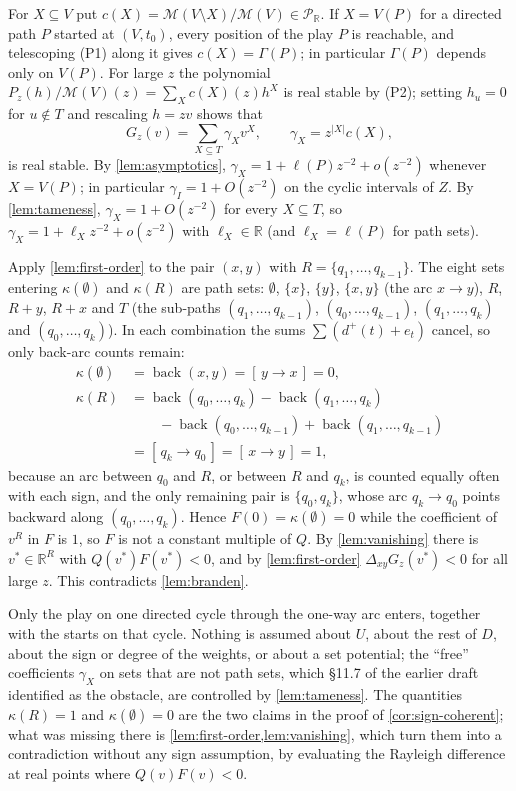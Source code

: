 \documentclass[final]{siamart0516}
\numberwithin{theorem}{section}
\numberwithin{equation}{section}
\theoremstyle{siamnonum}
\theoremstyle{plain}
\providecommand{\qed}{\hfill\proofbox}
\newcommand{\RR}{\mathbb{R}}
\newcommand{\Puis}{\mathcal{P}_{\RR}}
\newcommand{\Mpot}{\mathcal{M}}           %
\newcommand{\back}{\operatorname{back}}
\begin{document}
For $X\subseteq V$ put $c(X)=\Mpot(V\setminus X)/\Mpot(V)\in\Puis$. If $X=V(P)$ for a directed path $P$ started at $(V,t_0)$, every position of the play $P$ is reachable, and telescoping \textup{(P1)} along it gives $c(X)=\Gamma(P)$; in particular $\Gamma(P)$ depends only on $V(P)$. For large $z$ the polynomial $P_z(h)/\Mpot(V)(z)=\sum_Xc(X)(z)h^X$ is real stable by \textup{(P2)}; setting $h_u=0$ for $u\notin T$ and rescaling $h=zv$ shows that
\[
G_z(v)=\sum_{X\subseteq T}\gamma_Xv^X,\qquad \gamma_X=z^{|X|}c(X),
\]
is real stable. By \cref{lem:asymptotics}, $\gamma_X=1+\ell(P)z^{-2}+o(z^{-2})$ whenever $X=V(P)$; in particular $\gamma_I=1+O(z^{-2})$ on the cyclic intervals of $Z$. By \cref{lem:tameness}, $\gamma_X=1+O(z^{-2})$ for every $X\subseteq T$, so $\gamma_X=1+\ell_Xz^{-2}+o(z^{-2})$ with $\ell_X\in\RR$ (and $\ell_X=\ell(P)$ for path sets).

Apply \cref{lem:first-order} to the pair $(x,y)$ with $R=\{q_1,\dots,q_{k-1}\}$. The eight sets entering $\kappa(\emptyset)$ and $\kappa(R)$ are path sets: $\emptyset$, $\{x\}$, $\{y\}$, $\{x,y\}$ (the arc $x\to y$), $R$, $R+y$, $R+x$ and $T$ (the sub-paths $(q_1,\dots,q_{k-1})$, $(q_0,\dots,q_{k-1})$, $(q_1,\dots,q_k)$ and $(q_0,\dots,q_k)$). In each combination the sums $\sum(d^{+}(t)+e_t)$ cancel, so only back-arc counts remain:
\begin{align*}
\kappa(\emptyset)&=\back(x,y)=[\,y\to x\,]=0,\\
\kappa(R)&=\back(q_0,\dots,q_k)-\back(q_1,\dots,q_k)\\
&\qquad-\back(q_0,\dots,q_{k-1})+\back(q_1,\dots,q_{k-1})\\
&=[\,q_k\to q_0\,]=[\,x\to y\,]=1,
\end{align*}
because an arc between $q_0$ and $R$, or between $R$ and $q_k$, is counted equally often with each sign, and the only remaining pair is $\{q_0,q_k\}$, whose arc $q_k\to q_0$ points backward along $(q_0,\dots,q_k)$. Hence $F(0)=\kappa(\emptyset)=0$ while the coefficient of $v^R$ in $F$ is $1$, so $F$ is not a constant multiple of $Q$. By \cref{lem:vanishing} there is $v^{*}\in\RR^R$ with $Q(v^{*})F(v^{*})<0$, and by \cref{lem:first-order} $\Delta_{xy}G_z(v^{*})<0$ for all large $z$. This contradicts \cref{lem:branden}. \qed

\begin{remark}\label{rem:locality}
Only the play on one directed cycle through the one-way arc enters, together with the starts on that cycle. Nothing is assumed about $U$, about the rest of $D$, about the sign or degree of the weights, or about a set potential; the ``free'' coefficients $\gamma_X$ on sets that are not path sets, which \S11.7 of the earlier draft identified as the obstacle, are controlled by \cref{lem:tameness}. The quantities $\kappa(R)=1$ and $\kappa(\emptyset)=0$ are the two claims in the proof of \cref{cor:sign-coherent}; what was missing there is \cref{lem:first-order,lem:vanishing}, which turn them into a contradiction without any sign assumption, by evaluating the Rayleigh difference at real points where $Q(v)F(v)<0$.
\end{remark}
\end{document}
